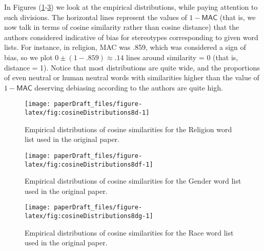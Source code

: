 \documentclass[
  12pt,
  dvipsnames,enabledeprecatedfontcommands]{scrartcl}
\begin{document}
In Figures (\ref{fig:empirical0}-\ref{fig:empirical3}) we look at the
empirical distributions, while paying attention to such divisions. The
horizontal lines represent the values of \(1 - \mathsf{MAC}\) (that is,
we now talk in terms of cosine similarity rather than cosine distance)
that the authors considered indicative of bias for stereotypes
corresponding to given word lists. For instance, in religion,
\textsf{MAC} was .859, which was considered a sign of bias, so we plot
\(0\pm (1-.859)\approx .14\) lines around similarity = 0 (that is,
distance = 1). Notice that most distributions are quite wide, and the
proportions of even neutral or human neutral words with similarities
higher than the value of \(1 - \mathsf{MAC}\) deserving debiasing
according to the authors are quite high.

\begin{figure}[H]

\begin{center}\texttt{[image: paperDraft\_files/figure-latex/fig:cosineDistributions8d-1]} \end{center}

\caption{Empirical distributions of cosine similarities  for the Religion word list  used in  the original paper. }

\label{fig:empirical0}
\end{figure}

\begin{figure}[H]

\begin{center}\texttt{[image: paperDraft\_files/figure-latex/fig:cosineDistributions8df-1]} \end{center}

\caption{Empirical distributions of cosine similarities for the Gender word list used in  the original paper.  }

\label{fig:empirical2}
\end{figure}

\begin{figure}[H]

\begin{center}\texttt{[image: paperDraft\_files/figure-latex/fig:cosineDistributions8dg-1]} \end{center}

\caption{Empirical distributions of cosine similarities  for the Race word list used in  the original paper.  }

\label{fig:empirical3}
\end{figure}
\end{document}
